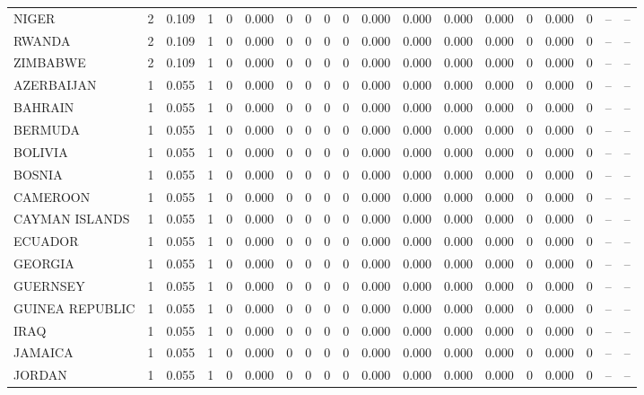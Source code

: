 \begin{tabular}{lrrrrrrrrrrrrrrrrrr}
NIGER & 2 & 0.109 & 1 & 0 & 0.000 & 0 & 0 & 0 & 0 & 0.000 & 0.000 & 0.000 & 0.000 & 0 & 0.000 & 0 & -- & -- \\
RWANDA & 2 & 0.109 & 1 & 0 & 0.000 & 0 & 0 & 0 & 0 & 0.000 & 0.000 & 0.000 & 0.000 & 0 & 0.000 & 0 & -- & -- \\
ZIMBABWE & 2 & 0.109 & 1 & 0 & 0.000 & 0 & 0 & 0 & 0 & 0.000 & 0.000 & 0.000 & 0.000 & 0 & 0.000 & 0 & -- & -- \\
AZERBAIJAN & 1 & 0.055 & 1 & 0 & 0.000 & 0 & 0 & 0 & 0 & 0.000 & 0.000 & 0.000 & 0.000 & 0 & 0.000 & 0 & -- & -- \\
BAHRAIN & 1 & 0.055 & 1 & 0 & 0.000 & 0 & 0 & 0 & 0 & 0.000 & 0.000 & 0.000 & 0.000 & 0 & 0.000 & 0 & -- & -- \\
BERMUDA & 1 & 0.055 & 1 & 0 & 0.000 & 0 & 0 & 0 & 0 & 0.000 & 0.000 & 0.000 & 0.000 & 0 & 0.000 & 0 & -- & -- \\
BOLIVIA & 1 & 0.055 & 1 & 0 & 0.000 & 0 & 0 & 0 & 0 & 0.000 & 0.000 & 0.000 & 0.000 & 0 & 0.000 & 0 & -- & -- \\
BOSNIA & 1 & 0.055 & 1 & 0 & 0.000 & 0 & 0 & 0 & 0 & 0.000 & 0.000 & 0.000 & 0.000 & 0 & 0.000 & 0 & -- & -- \\
CAMEROON & 1 & 0.055 & 1 & 0 & 0.000 & 0 & 0 & 0 & 0 & 0.000 & 0.000 & 0.000 & 0.000 & 0 & 0.000 & 0 & -- & -- \\
CAYMAN ISLANDS & 1 & 0.055 & 1 & 0 & 0.000 & 0 & 0 & 0 & 0 & 0.000 & 0.000 & 0.000 & 0.000 & 0 & 0.000 & 0 & -- & -- \\
ECUADOR & 1 & 0.055 & 1 & 0 & 0.000 & 0 & 0 & 0 & 0 & 0.000 & 0.000 & 0.000 & 0.000 & 0 & 0.000 & 0 & -- & -- \\
GEORGIA & 1 & 0.055 & 1 & 0 & 0.000 & 0 & 0 & 0 & 0 & 0.000 & 0.000 & 0.000 & 0.000 & 0 & 0.000 & 0 & -- & -- \\
GUERNSEY & 1 & 0.055 & 1 & 0 & 0.000 & 0 & 0 & 0 & 0 & 0.000 & 0.000 & 0.000 & 0.000 & 0 & 0.000 & 0 & -- & -- \\
GUINEA REPUBLIC & 1 & 0.055 & 1 & 0 & 0.000 & 0 & 0 & 0 & 0 & 0.000 & 0.000 & 0.000 & 0.000 & 0 & 0.000 & 0 & -- & -- \\
IRAQ & 1 & 0.055 & 1 & 0 & 0.000 & 0 & 0 & 0 & 0 & 0.000 & 0.000 & 0.000 & 0.000 & 0 & 0.000 & 0 & -- & -- \\
JAMAICA & 1 & 0.055 & 1 & 0 & 0.000 & 0 & 0 & 0 & 0 & 0.000 & 0.000 & 0.000 & 0.000 & 0 & 0.000 & 0 & -- & -- \\
JORDAN & 1 & 0.055 & 1 & 0 & 0.000 & 0 & 0 & 0 & 0 & 0.000 & 0.000 & 0.000 & 0.000 & 0 & 0.000 & 0 & -- & -- \\

\end{tabular}
